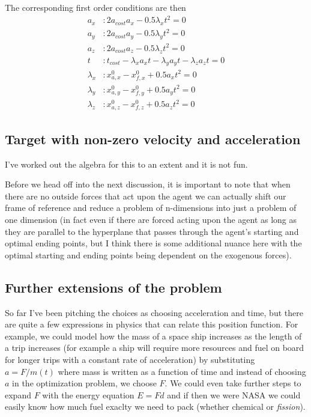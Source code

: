 \documentclass[11pt,english]{article}
\begin{document}
The corresponding first order conditions are then
\begin{align*}
a_x&: 2a_{cost}a_x - 0.5\lambda_xt^2 = 0\\
a_y&: 2a_{cost}a_y - 0.5\lambda_yt^2 = 0\\
a_z&: 2a_{cost}a_z - 0.5\lambda_zt^2 = 0\\
t&: t_{cost} - \lambda_x a_xt - \lambda_y a_yt - \lambda_z a_zt =0\\ 
\lambda_x&: x_{a,x}^0 - x_{f,x}^0 + 0.5a_xt^2 = 0\\
\lambda_y&: x_{a,y}^0 - x_{f,y}^0 + 0.5a_yt^2 = 0\\
\lambda_z&: x_{a,z}^0 - x_{f,z}^0 + 0.5a_zt^2 = 0
\end{align*}



\subsection*{Target with non-zero velocity and acceleration}

I've worked out the algebra for this to an extent and it is not fun.

\noindent Before we head off into the next discussion, it is important to note that when there are no outside forces that act upon the agent we can actually shift our frame of reference and reduce a problem of n-dimensions into just a problem of one dimension (in fact even if there are forced acting upon the agent as long as they are parallel to the hyperplane that passes through the agent's starting and optimal ending points, but I think there is some additional nuance here with the optimal starting and ending points being dependent on the exogenous forces).

\subsection*{Further extensions of the problem}

So far I've been pitching the choices as choosing acceleration and time, but there are quite a few expressions in physics that can relate this position function. For example, we could model how the mass of a space ship increases as the length of a trip increases (for example a ship will require more resources and fuel on board for longer trips with a constant rate of acceleration) by substituting $a = F/m(t)$ where mass is written as a function of time and instead of choosing $a$ in the optimization problem, we choose $F$. We could even take further steps to expand $F$ with the energy equation $E = Fd$ and if then we were NASA we could easily know how much fuel exaclty we need to pack (whether chemical or \textit{fission}).
\end{document}
